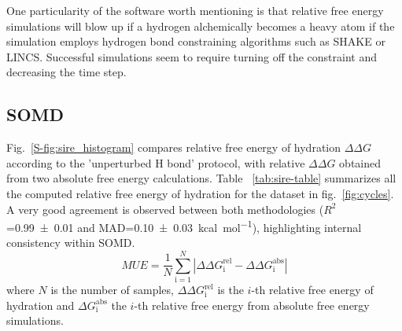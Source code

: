 \documentclass[journal=jctcce,manuscript=article]{achemso}
\begin{document}
One particularity of the software worth mentioning is 
that relative free energy simulations will blow up if a hydrogen alchemically becomes a heavy 
atom if the simulation employs hydrogen bond constraining algorithms such as SHAKE or LINCS.
Successful simulations seem to require turning off the constraint and decreasing the time step.

\subsection{SOMD}
\label{sec:somd-results}

Fig.~\ref{S-fig:sire_histogram} compares relative free energy of hydration $\Delta\Delta G$ according to the 'unperturbed H bond' protocol, with relative $\Delta \Delta G$ obtained from two absolute free energy calculations. Table ~\ref{tab:sire-table} summarizes all the computed relative free energy of hydration for the dataset in fig.~\ref{fig:cycles}.
A very good agreement is observed between both methodologies 
($R^2$=\SI{0.99+-0.01}{} and 
MAD=\SI{0.10+-0.03}{kcal.mol^{-1}}), highlighting internal consistency within 
SOMD.
\begin{equation}
 \label{eq:MUE}
 MUE = \frac{1}{N}\sum_\mathrm{i=1}^N \left | \Delta\Delta G^\mathrm{rel}_\mathrm{i} - \Delta\Delta G^\mathrm{abs}_\mathrm{i} \right |
\end{equation}
where $N$ is the number of samples, $\Delta\Delta G^\mathrm{rel}_\mathrm{i}$ is the $i$-th relative free energy of hydration and  $\Delta G^\mathrm{abs}_\mathrm{i}$ the $i$-th relative free energy from absolute free energy simulations.
\end{document}
